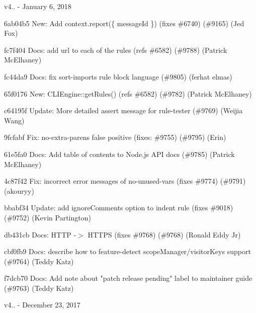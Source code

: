v4.. -\/ January 6, 2018


\begin{DoxyItemize}
\item 6ab04b5 New\+: Add context.\+report(\{ message\+Id \}) (fixes \#6740) (\#9165) (Jed Fox)
\item fc7f404 Docs\+: add url to each of the rules (refs \#6582) (\#9788) (Patrick Mc\+Elhaney)
\item fc44da9 Docs\+: fix sort-\/imports rule block language (\#9805) (ferhat elmas)
\item 65f0176 New\+: CLIEngine\+::get\+Rules() (refs \#6582) (\#9782) (Patrick Mc\+Elhaney)
\item c64195f Update\+: More detailed assert message for rule-\/tester (\#9769) (Weijia Wang)
\item 9fcfabf Fix\+: no-\/extra-\/parens false positive (fixes\+: \#9755) (\#9795) (Erin)
\item 61e5fa0 Docs\+: Add table of contents to Node.\+js API docs (\#9785) (Patrick Mc\+Elhaney)
\item 4c87f42 Fix\+: incorrect error messages of no-\/unused-\/vars (fixes \#9774) (\#9791) (akouryy)
\item bbabf34 Update\+: add {\ttfamily ignore\+Comments} option to {\ttfamily indent} rule (fixes \#9018) (\#9752) (Kevin Partington)
\item db431cb Docs\+: HTTP -\/\texorpdfstring{$>$}{>} HTTPS (fixes \#9768) (\#9768) (Ronald Eddy Jr)
\item cbf0fb9 Docs\+: describe how to feature-\/detect scope\+Manager/visitor\+Keys support (\#9764) (Teddy Katz)
\item f7dcb70 Docs\+: Add note about "{}patch release pending"{} label to maintainer guide (\#9763) (Teddy Katz)
\end{DoxyItemize}

v4.. -\/ December 23, 2017


